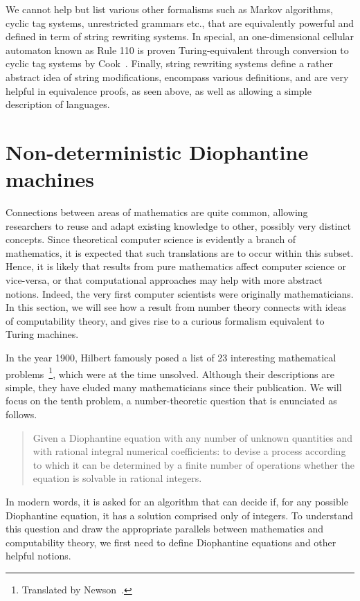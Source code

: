\documentclass[12pt]{article}
\begin{document}
We cannot help but list various other formalisms such as Markov algorithms,
cyclic tag systems, unrestricted grammars etc., that are equivalently powerful
and defined in term of string rewriting systems. In special, an one-dimensional
cellular automaton known as Rule 110 is proven Turing-equivalent through
conversion to cyclic tag systems by Cook~\cite{Cook:article:2004:mar}. Finally,
string rewriting systems define a rather abstract idea of string modifications,
encompass various definitions, and are very helpful in equivalence proofs, as
seen above, as well as allowing a simple description of languages.

\section{Non-deterministic Diophantine machines}\label{sec:nddm}

Connections between areas of mathematics are quite common, allowing researchers
to reuse and adapt existing knowledge to other, possibly very distinct
concepts. Since theoretical computer science is evidently a branch of
mathematics, it is expected that such translations are to occur within this
subset. Hence, it is likely that results from pure mathematics affect computer
science or vice-versa, or that computational approaches may help with more
abstract notions. Indeed, the very first computer scientists were originally
mathematicians. In this section, we will see how a result from number theory
connects with ideas of computability theory, and gives rise to a curious
formalism equivalent to Turing machines.

In the year 1900, Hilbert famously posed a list of 23 interesting mathematical
problems~\cite{Hilbert:article:1900:dec}\footnote{Translated by
Newson~\cite{Hilbert:article:1902:jul}.}, which were at the time unsolved.
Although their descriptions are simple, they have eluded many mathematicians
since their publication. We will focus on the tenth problem, a number-theoretic
question that is enunciated as follows.

\begin{quote}
    Given a Diophantine equation with any number of unknown quantities and with
    rational integral numerical coefficients: to devise a process according to
    which it can be determined by a finite number of operations whether the
    equation is solvable in rational integers.
\end{quote}

In modern words, it is asked for an algorithm that can decide if, for any
possible Diophantine equation, it has a solution comprised only of integers. To
understand this question and draw the appropriate parallels between mathematics
and computability theory, we first need to define Diophantine equations and
other helpful notions.
\end{document}

